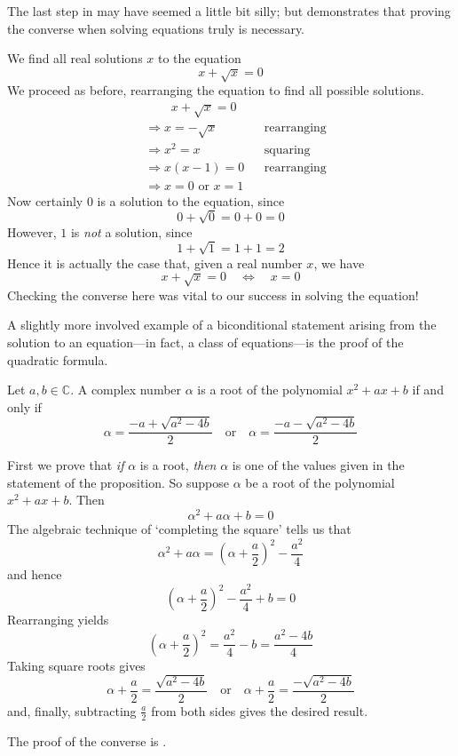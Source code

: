 The last step in  may have seemed a little bit silly; but  demonstrates that proving the converse when solving equations truly is necessary.

\begin{example}
\label{exSolveSqrtSecondExample}
We find all real solutions $x$ to the equation
\[
x+\sqrt{x}=0
\]
We proceed as before, rearranging the equation to find all possible solutions.
\begin{align*}
&\phantom{\Rightarrow\;\;} x+\sqrt{x} = 0 && \\
&\Rightarrow x=-\sqrt{x} && \text{rearranging} \\
&\Rightarrow x^2=x && \text{squaring} \\
&\Rightarrow x(x-1)=0 && \text{rearranging} \\
&\Rightarrow x=0 \text{ or } x=1 && 
\end{align*}
Now certainly $0$ is a solution to the equation, since
\[
0+\sqrt{0} = 0+0 = 0
\]
However, $1$ is \textit{not} a solution, since
\[
1+\sqrt{1} = 1+1 = 2
\]
Hence it is actually the case that, given a real number $x$, we have
\[
x+\sqrt{x} = 0 \quad \Leftrightarrow \quad x=0
\]
Checking the converse here was vital to our success in solving the equation!
\end{example}

A slightly more involved example of a biconditional statement arising from the solution to an equation---in fact, a class of equations---is the proof of the quadratic formula.

\begin{itheorem}
\label{thmQuadraticFormula}
Let $a,b \in \mathbb{C}$. A complex number $\alpha$ is a root of the polynomial $x^2+ax+b$ if and only if
\[
\alpha = \frac{-a+\sqrt{a^2-4b}}{2} \quad \text{or} \quad \alpha =\frac{-a-\sqrt{a^2-4b}}{2}
\]
\end{itheorem}

\begin{cproof}
First we prove that \textit{if} $\alpha$ is a root, \textit{then} $\alpha$ is one of the values given in the statement of the proposition. So suppose $\alpha$ be a root of the polynomial $x^2+ax+b$. Then
\[
\alpha^2 + a\alpha + b = 0
\]
The algebraic technique of `completing the square' tells us that
\[
\alpha^2 + a\alpha = \left( \alpha + \frac{a}{2} \right)^2 - \frac{a^2}{4}
\]
and hence
\[
\left( \alpha + \frac{a}{2} \right)^2 - \frac{a^2}{4} + b = 0
\]
Rearranging yields
\[
\left( \alpha + \frac{a}{2} \right)^2  = \frac{a^2}{4} - b = \frac{a^2-4b}{4}
\]
Taking square roots gives
\[
\alpha + \frac{a}{2} = \frac{\sqrt{a^2-4b}}{2} \quad \text{or} \quad \alpha + \frac{a}{2} = \frac{-\sqrt{a^2-4b}}{2}
\]
and, finally, subtracting $\frac{a}{2}$ from both sides gives the desired result.

The proof of the converse is .
\end{cproof}

